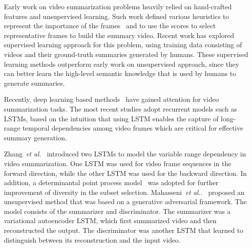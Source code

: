 \documentclass[letterpaper]{article} \usepackage{aaai19}  \usepackage{times}  \usepackage{helvet}  \usepackage{courier}  \usepackage{url}  \usepackage{graphicx}  \frenchspacing  \setlength{\pdfpagewidth}{8.5in}  \setlength{\pdfpageheight}{11in}
\newcommand{\etal}{\textit{et al.}}
\begin{document}
Early work on video summarization problems heavily relied on hand-crafted features and unsupervised learning. Such work defined various heuristics to represent the importance of the frames~\cite{song2015tvsum,ngo2003automatic,lu2013story,kim2014reconstructing,khosla2013large} and to use the scores to select representative frames to build the summary video. Recent work has explored supervised learning approach for
this problem, using training data consisting
of videos and their ground-truth summaries generated by humans. These
supervised learning methods outperform early work on unsupervised
approach, since they can better learn the high-level semantic knowledge that is
used by humans to generate summaries.

Recently, deep learning based methods~\cite{zhang2016video,Mahasseni2017VAEGAN,sharghi2017query} have gained attention for video summarization tasks. The most recent studies adopt recurrent models such as LSTMs, based on the intuition that using LSTM enables the capture of long-range temporal dependencies among video frames which are critical for effective summary generation. 

Zhang~\etal~\cite{zhang2016video} introduced two LSTMs to model the variable range dependency in video summarization. One LSTM was used for video frame sequences in the forward direction, while the other LSTM was used for the backward direction. In addition, a determinantal point process model~\cite{gong2014diverse,zhang2016summary} was adopted for further improvement of diversity in the subset selection. Mahasseni~\etal.~\cite{Mahasseni2017VAEGAN} proposed an unsupervised method that was based on a generative adversarial framework. The model consists of the summarizer and discriminator. The summarizer was a variational autoencoder LSTM, which first summarized video and then reconstructed the output. The discriminator was another LSTM that learned to distinguish between its reconstruction and the input video. 
\end{document}
